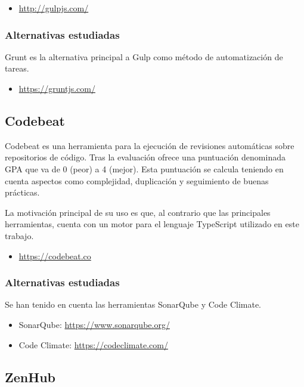 \begin{itemize}
	\item \url{http://gulpjs.com/}
\end{itemize}

\subsubsection{Alternativas estudiadas}

Grunt es la alternativa principal a Gulp como método de automatización de tareas.

\begin{itemize}
	\item \url{https://gruntjs.com/}
\end{itemize}

\subsection{Codebeat}

Codebeat es una herramienta para la ejecución de revisiones automáticas sobre repositorios de código. Tras la evaluación ofrece una puntuación denominada GPA que va de 0 (peor) a 4 (mejor). Esta puntuación se calcula teniendo en cuenta aspectos como complejidad, duplicación y seguimiento de buenas prácticas.

La motivación principal de su uso es que, al contrario que las principales herramientas, cuenta con un motor para el lenguaje TypeScript utilizado en este trabajo.

\begin{itemize}
	\item \url{https://codebeat.co}
\end{itemize}

\subsubsection{Alternativas estudiadas}

Se han tenido en cuenta las herramientas SonarQube y Code Climate.
\begin{itemize}
	\item SonarQube: \url{https://www.sonarqube.org/}
	\item Code Climate: \url{https://codeclimate.com/}
\end{itemize}

\subsection{ZenHub}

